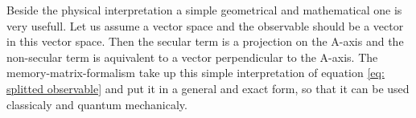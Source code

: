 Beside the physical interpretation a simple geometrical and mathematical one is very usefull.
Let us assume a vector space and the observable should be a vector in this vector space.
Then the secular term is a projection on the A-axis and the non-secular term is aquivalent to a vector perpendicular to the A-axis.
The memory-matrix-formalism take up this simple interpretation of equation \eqref{eq: splitted observable} and put it in a general and exact form, so that it can be used classicaly and quantum mechanicaly.
%
%
%
%
%
%
%
%
%
%
%
%
%
